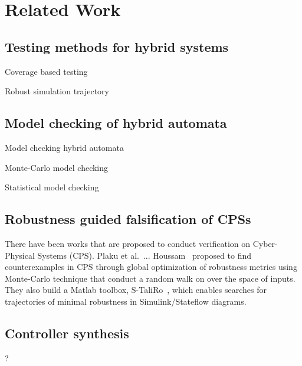 \section{Related Work}\label{sec:related_work}

\subsection{Testing methods for hybrid systems}

\cite{kapinski2003systematic,zhao2003generating,dang2009coverage}

Coverage based testing~\cite{esposito2004adaptive,bhatia2004incremental,branicky2006sampling}

Robust simulation trajectory~\cite{Donze:2007:SSU:1760804.1760822,girard2006verification,julius2007robust,Lerda:2008:VSC:1423033.1423059}

\subsection{Model checking of hybrid automata}

Model checking hybrid automata~\cite{Alur:1995:AAH:202379.202381,Henzinger:1995:WDH:225058.225162,henzinger1997hytech}

Monte-Carlo model checking~\cite{grosu2005monte}

Statistical model checking~\cite{Younes:2006:SPM:1182767.1182770,Clarke:2009:SMC:1533832.1533850,clarke2011statistical,Zuliani:2010:BSM:1755952.1755987}

\subsection{Robustness guided falsification of CPSs}

There have been works that are proposed to conduct verification on Cyber-Physical Systems (CPS).
Plaku et al.~\cite{Plaku:2009:FLS:1532891.1532932}...
Houssam~\cite{TLF_CPS_2013} proposed to find counterexamples in CPS through global optimization of robustness metrics using Monte-Carlo technique that conduct a random walk on over the space of inputs. They also build a Matlab toolbox, S-TaliRo~\cite{S-TaliRo}, which enables searches for trajectories of minimal robustness in Simulink/Stateflow diagrams.

\subsection{Controller synthesis}
?
